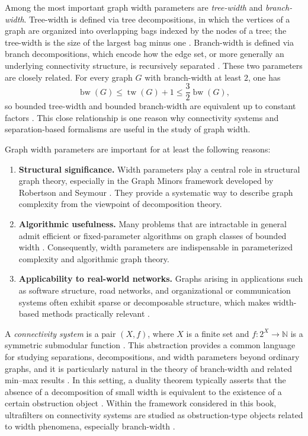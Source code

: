 \documentclass[10pt]{book}
\theoremstyle{definition}
\begin{document}
Among the most important graph width parameters are \emph{tree-width} and \emph{branch-width}.
Tree-width is defined via tree decompositions, in which the vertices of a graph are organized into overlapping bags indexed by the nodes of a tree; the tree-width is the size of the largest bag minus one \cite{47,214}.
Branch-width is defined via branch decompositions, which encode how the edge set, or more generally an underlying connectivity structure, is recursively separated \cite{9,10,213}.
These two parameters are closely related.
For every graph \(G\) with branch-width at least \(2\), one has
\[
\operatorname{bw}(G)\le \operatorname{tw}(G)+1 \le \frac{3}{2}\operatorname{bw}(G),
\]
so bounded tree-width and bounded branch-width are equivalent up to constant factors \cite{213}.
This close relationship is one reason why connectivity systems and separation-based formalisms are useful in the study of graph width.

Graph width parameters are important for at least the following reasons:
\begin{enumerate}
    \item \textbf{Structural significance.}
    Width parameters play a central role in structural graph theory, especially in the Graph Minors framework developed by Robertson and Seymour \cite{9,10}.
    They provide a systematic way to describe graph complexity from the viewpoint of decomposition theory.

    \item \textbf{Algorithmic usefulness.}
    Many problems that are intractable in general admit efficient or fixed-parameter algorithms on graph classes of bounded width \cite{287,288,289}.
    Consequently, width parameters are indispensable in parameterized complexity and algorithmic graph theory.

    \item \textbf{Applicability to real-world networks.}
    Graphs arising in applications such as software structure, road networks, and organizational or communication systems often exhibit sparse or decomposable structure, which makes width-based methods practically relevant \cite{389,390,diestel2024tangles}.
\end{enumerate}

A \emph{connectivity system} is a pair \((X,f)\), where \(X\) is a finite set and \(f:2^{X}\to\mathbb{N}\) is a symmetric submodular function \cite{9}.
This abstraction provides a common language for studying separations, decompositions, and width parameters beyond ordinary graphs, and it is particularly natural in the theory of branch-width and related min--max results \cite{9,10,16}.
In this setting, a duality theorem typically asserts that the absence of a decomposition of small width is equivalent to the existence of a certain obstruction object \cite{seymour1993graph}.
Within the framework considered in this book, ultrafilters on connectivity systems are studied as obstruction-type objects related to width phenomena, especially branch-width \cite{16}.
\end{document}
